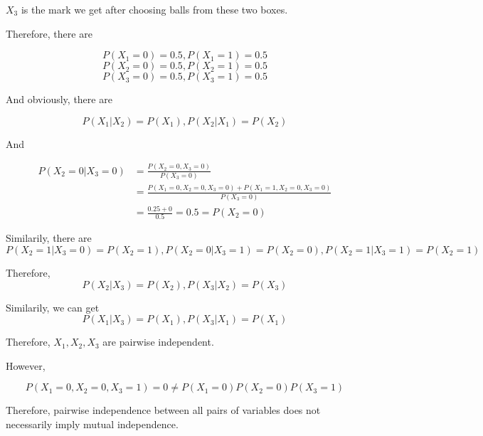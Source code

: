\documentclass[UTF8]{article}
\begin{document}
$X_3$ is the mark we get after choosing balls from these two boxes.

Therefore, there are

$$P(X_1 = 0) = 0.5, P(X_1 = 1) = 0.5$$
$$P(X_2 = 0) = 0.5, P(X_2 = 1) = 0.5$$
$$P(X_3 = 0) = 0.5, P(X_3 = 1) = 0.5$$

And obviously, there are

$$P(X_1 | X_2) = P(X_1), P(X_2 | X_1) = P(X_2)$$

And

\begin{align*}
    P(X_2 = 0 | X_3 = 0) &= \frac{P(X_2 = 0, X_3 = 0)}{P(X_3 = 0)}\\
    &= \frac{P(X_1 = 0, X_2 = 0, X_3 = 0)+P(X_1 = 1, X_2=0, X_3 = 0)}{P(X_3 = 0)}\\
    &= \frac{0.25 + 0}{0.5} = 0.5 = P(X_2 = 0)
\end{align*}

Similarily, there are
$$P(X_2 = 1 | X_3 = 0) =P(X_2 = 1),  P(X_2 = 0 | X_3 = 1) =P(X_2 = 0), P(X_2 = 1 | X_3 = 1) =P(X_2 = 1)$$

Therefore,
$$P(X_2 | X_3) = P(X_2), P(X_3 | X_2) = P(X_3)$$

Similarily, we can get
$$P(X_1 | X_3) = P(X_1), P(X_3 | X_1) = P(X_1)$$

Therefore, $X_1, X_2, X_3$ are pairwise independent.

However,

$$P(X_1 = 0, X_2 = 0, X_3 = 1) = 0 \neq P(X_1 = 0)P(X_2 = 0)P(X_3 = 1)$$

Therefore, pairwise independence between all pairs of variables does not necessarily imply mutual independence.
\end{document}

